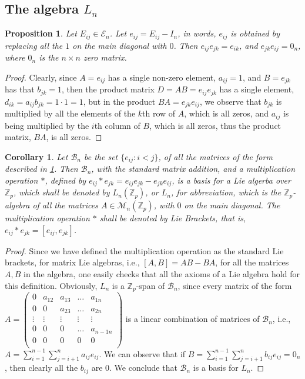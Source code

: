 \documentclass[12pt]{article}
\newtheorem{proposition}[theorem]{Proposition}
\newtheorem{corollary}[theorem]{Corollary}
\begin{document}
\subsection{The algebra $L_n$}
\begin{proposition}
\label{prop.lie.algebra.commutator}
Let $E_{ij}\in\mathcal{E}_n$. Let $e_{ij}=E_{ij}-I_n$, in words, $e_{ij}$ is obtained by replacing all the $1$ on the main diagonal with $0$. Then $e_{ij}e_{jk}=e_{ik}$, and $e_{jk}e_{ij}=0_n$, where $0_n$ is the $n\times n$ zero matrix.
\end{proposition}
\begin{proof}
Clearly, since $A=e_{ij}$ has a single non-zero element, $a_{ij}=1$, and $B=e_{jk}$ has that $b_{jk}=1$, then the product matrix $D=AB=e_{ij}e_{jk}$ has a single element, $d_{ik}=a_{ij}b_{jk}=1\cdot 1=1$, but in the product $BA=e_{jk}e_{ij}$, we observe that $b_{jk}$ is multiplied by all the elements of the $k$th row of $A$, which is all zeros, and $a_{ij}$ is being multiplied by the $i$th column of $B$, which is all zeros, thus the product matrix, $BA$, is all zeros.
\end{proof}
\begin{corollary}
\label{cor.lie.algebra}
Let $\mathcal{B}_n$ be the set $\{e_{ij} : i<j\}$, of all the matrices of the form described in \ref{prop.lie.algebra.commutator}. Then $\mathcal{B}_n$, with the standard matrix addition, and a multiplication operation $\ast$, defined by $e_{ij}*e_{jk}=e_{ij}e_{jk}-e_{jk}e_{ij}$, is a basis for a Lie algerba over $\mathbb{Z}_p$, which shall be denoted by $L_n(\mathbb{Z}_p)$, or $L_n$, for abbreviation, which is the $\mathbb{Z}_p$-algebra of all the matrices $A\in\mathcal{M}_n(\mathbb{Z}_p)$, with $0$ on the main diagonal. The multiplication operation $\ast$ shall be denoted by Lie Brackets, that is, $e_{ij}*e_{jk}=[e_{ij},e_{jk}]$.
\end{corollary}
\begin{proof}
Since we have defined the multiplication operation as the standard Lie brackets, for matrix Lie algebras, i.e., $[A,B]=AB-BA$, for all the matrices $A,B$ in the algebra, one easily checks that all the axioms of a Lie algebra hold for this definition. Obviously, $L_n$ is a $\mathbb{Z}_p$-span of $\mathcal{B}_n$, since every matrix of the form $A=\begin{pmatrix}
0 & a_{12} & a_{13} & \dots & a_{1n}\\
0 & 0 & a_{23} & \dots & a_{2n}\\
\vdots & \vdots & \vdots & \vdots & \vdots\\
0 & 0 & 0 & \dots & a_{n-1n}\\
0 & 0 & 0 & 0 & 0\\
\end{pmatrix}$ is a linear combination of matrices of $\mathcal{B}_n$, i.e., $A=\sum_{i=1}^{n-1}\sum_{j=i+1}^n a_{ij}e_{ij}$. We can observe that if $B=\sum_{i=1}^{n-1}\sum_{j=i+1}^n b_{ij}e_{ij}=0_n$, then clearly all the $b_{ij}$ are $0$. We conclude that $\mathcal{B}_n$ is a basis for $L_n$.
\end{proof}
\end{document}
